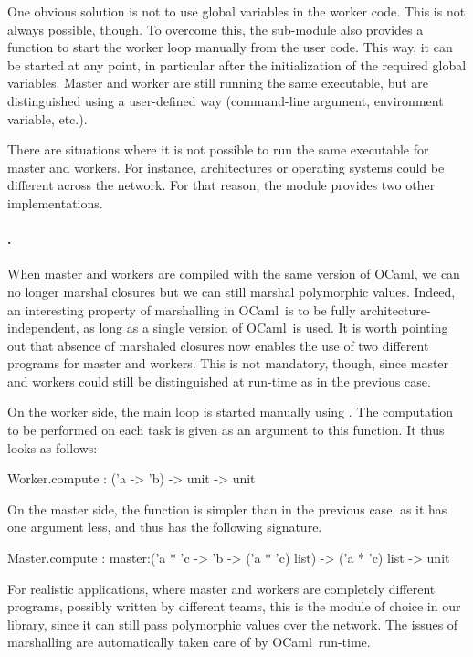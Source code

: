 \documentclass{llncs}
\newcommand{\Ocaml}{OCaml}
\begin{document}
  One obvious solution is not to use global variables in the worker
  code. This is not always possible, though.  To overcome this, the
   sub-module also provides a  function to
  start the worker loop manually from the user code. This way, it can
  be started at any point, in particular after the initialization of
  the required global variables.  Master and worker are still running
  the same executable, but are distinguished using a user-defined way
  (command-line argument, environment variable, etc.).

  \bigskip There are situations where it is not possible to run the
  same executable for master and workers.  For instance, architectures
  or operating systems could be different across the network.  For
  that reason, the  module provides two other
  implementations.

  \paragraph{.} When master and workers are compiled with the
  same version of \Ocaml, we can no longer marshal closures but we can
  still marshal polymorphic values. Indeed, an interesting property of
  marshalling in \Ocaml\ is to be fully architecture-independent, as
  long as a single version of \Ocaml\ is used. It is worth pointing
  out that absence of marshaled closures now enables the use of two
  different programs for master and workers. This is not mandatory,
  though, since master and workers could still be distinguished at
  run-time as in the previous case.

  On the worker side, the main loop is started manually using
  . The computation to be performed on each task is
  given as an argument to this function. It thus looks as follows:
  \begin{ocaml}
    Worker.compute : ('a -> 'b) -> unit -> unit
  \end{ocaml}
  On the master side, the  function is simpler than in the
  previous case, as it has one argument less, and thus has the
  following signature.
  \begin{ocaml}
    Master.compute : 
      master:('a * 'c -> 'b -> ('a * 'c) list) -> ('a * 'c) list -> unit
  \end{ocaml}
  For realistic applications, where master and workers are completely
  different programs, possibly written by different teams, this is the
  module of choice in our library, since it can still pass polymorphic
  values over the network. The issues of marshalling are automatically
  taken care of by \Ocaml\ run-time.
\end{document}
